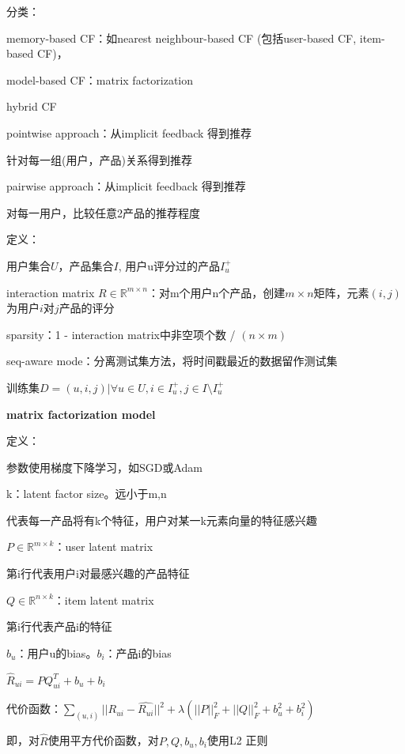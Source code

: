 \documentclass[UTF8]{ctexart}
\begin{document}
  分类：
  
  \quad memory-based CF：如nearest neighbour-based CF (包括user-based CF, item-based CF)，
  
  \quad model-based CF：matrix factorization 
  
  \quad hybrid CF

  \quad pointwise approach：从implicit feedback 得到推荐

  \quad \quad 针对每一组(用户，产品)关系得到推荐

  \quad pairwise approach：从implicit feedback 得到推荐

  \quad \quad 对每一用户，比较任意2产品的推荐程度

  定义：

  \quad 用户集合$U$，产品集合$I$, 用户u评分过的产品$I_u^+$

  \quad interaction matrix $R \in \mathbb{R}^{m \times n}$：对m个用户n个产品，创建$m \times n$矩阵，元素$(i, j)$为用户$i$对$j$产品的评分

  \quad sparsity：1 - interaction matrix中非空项个数 / $(n \times m)$

  \quad seq-aware mode：分离测试集方法，将时间戳最近的数据留作测试集

  \quad 训练集$D = {(u, i, j) | \forall u \in U, i \in I_u^+, j \in I \setminus I_u^+}$


  \textbf{matrix factorization model}

  \quad 定义：

  \quad \quad 参数使用梯度下降学习，如SGD或Adam

  \quad \quad k：latent factor size。远小于m,n

  \quad \quad \quad 代表每一产品将有k个特征，用户对某一k元素向量的特征感兴趣

  \quad \quad $P \in \mathbb{R}^{m \times k}$：user latent matrix

  \quad \quad \quad 第i行代表用户i对最感兴趣的产品特征

  \quad \quad $Q \in \mathbb{R}^{n \times k}$：item latent matrix

  \quad \quad \quad 第i行代表产品i的特征

  \quad \quad $b_u$：用户u的bias。$b_i$：产品i的bias

  \quad \quad $\hat{R}_{ui} = PQ^T_{ui} + b_u + b_i$

  \quad 代价函数：$\sum_{(u, i)} ||R_{ui} - \hat{R_{ui}}||^2 + \lambda(||P||_F^2 + ||Q||_F^2 + b_u^2 + b_i^2)$

  \quad \quad 即，对$\hat{R}$使用平方代价函数，对$P, Q, b_u, b_i$使用L2 正则 
\end{document}
